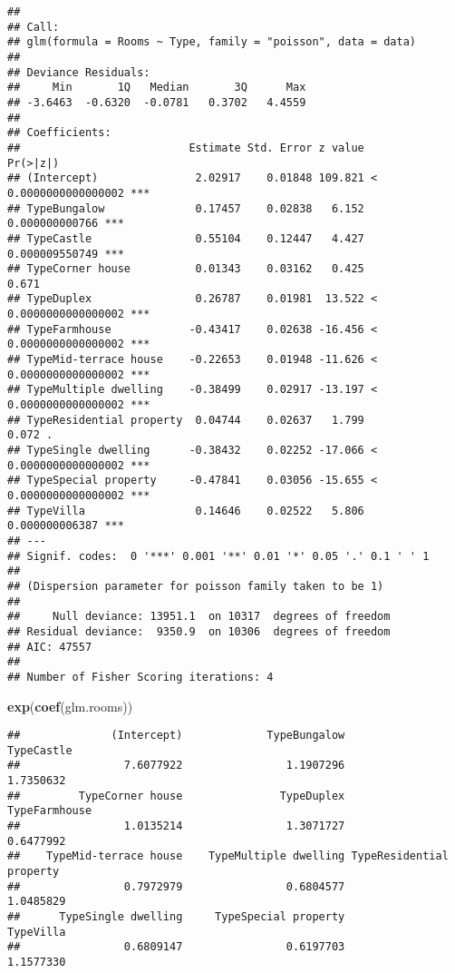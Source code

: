 \documentclass[
]{article}
\newenvironment{Shaded}{\begin{snugshade}}{\end{snugshade}}
\newcommand{\KeywordTok}[1]{\textcolor[rgb]{0.13,0.29,0.53}{\textbf{#1}}}
\newcommand{\NormalTok}[1]{#1}
\begin{document}
\begin{verbatim}
## 
## Call:
## glm(formula = Rooms ~ Type, family = "poisson", data = data)
## 
## Deviance Residuals: 
##     Min       1Q   Median       3Q      Max  
## -3.6463  -0.6320  -0.0781   0.3702   4.4559  
## 
## Coefficients:
##                          Estimate Std. Error z value             Pr(>|z|)    
## (Intercept)               2.02917    0.01848 109.821 < 0.0000000000000002 ***
## TypeBungalow              0.17457    0.02838   6.152       0.000000000766 ***
## TypeCastle                0.55104    0.12447   4.427       0.000009550749 ***
## TypeCorner house          0.01343    0.03162   0.425                0.671    
## TypeDuplex                0.26787    0.01981  13.522 < 0.0000000000000002 ***
## TypeFarmhouse            -0.43417    0.02638 -16.456 < 0.0000000000000002 ***
## TypeMid-terrace house    -0.22653    0.01948 -11.626 < 0.0000000000000002 ***
## TypeMultiple dwelling    -0.38499    0.02917 -13.197 < 0.0000000000000002 ***
## TypeResidential property  0.04744    0.02637   1.799                0.072 .  
## TypeSingle dwelling      -0.38432    0.02252 -17.066 < 0.0000000000000002 ***
## TypeSpecial property     -0.47841    0.03056 -15.655 < 0.0000000000000002 ***
## TypeVilla                 0.14646    0.02522   5.806       0.000000006387 ***
## ---
## Signif. codes:  0 '***' 0.001 '**' 0.01 '*' 0.05 '.' 0.1 ' ' 1
## 
## (Dispersion parameter for poisson family taken to be 1)
## 
##     Null deviance: 13951.1  on 10317  degrees of freedom
## Residual deviance:  9350.9  on 10306  degrees of freedom
## AIC: 47557
## 
## Number of Fisher Scoring iterations: 4
\end{verbatim}

\begin{Shaded}
\begin{Highlighting}[]
\KeywordTok{exp}\NormalTok{(}\KeywordTok{coef}\NormalTok{(glm.rooms)) }
\end{Highlighting}
\end{Shaded}

\begin{verbatim}
##              (Intercept)             TypeBungalow               TypeCastle 
##                7.6077922                1.1907296                1.7350632 
##         TypeCorner house               TypeDuplex            TypeFarmhouse 
##                1.0135214                1.3071727                0.6477992 
##    TypeMid-terrace house    TypeMultiple dwelling TypeResidential property 
##                0.7972979                0.6804577                1.0485829 
##      TypeSingle dwelling     TypeSpecial property                TypeVilla 
##                0.6809147                0.6197703                1.1577330
\end{verbatim}
\end{document}
